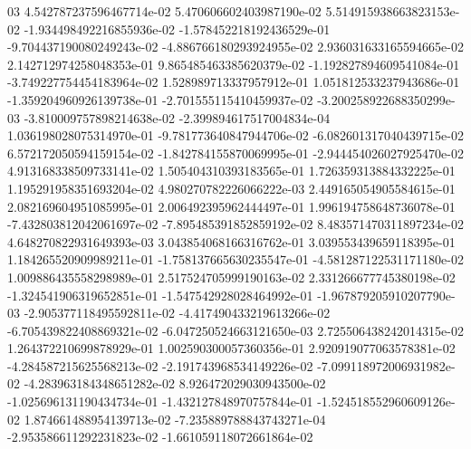 03	4.542787237596467714e-02	5.470606602403987190e-02	5.514915938663823153e-02	-1.934498492216855936e-02	-1.578452218192436529e-01	-9.704437190080249243e-02	-4.886766180293924955e-02	2.936031633165594665e-02	2.142712974258048353e-01	9.865485463385620379e-02	-1.192827894609541084e-01	-3.749227754454183964e-02	1.528989713337957912e-01	1.051812533237943686e-01	-1.359204960926139738e-01	-2.701555115410459937e-02	-3.200258922688350299e-03	-3.810009757898214638e-02	-2.399894617517004834e-04	1.036198028075314970e-01	-9.781773640847944706e-02	-6.082601317040439715e-02	6.572172050594159154e-02	-1.842784155870069995e-01	-2.944454026027925470e-02	4.913168338509733141e-02	1.505404310393183565e-01	1.726359313884332225e-01	1.195291958351693204e-02	4.980270782226066222e-03	2.449165054905584615e-01	2.082169604951085995e-01	2.006492395962444497e-01	1.996194758648736078e-01	-7.432803812042061697e-02	-7.895485391852859192e-02	8.483571470311897234e-02	4.648270822931649393e-03	3.043854068166316762e-01	3.039553439659118395e-01	1.184265520909989211e-01	-1.758137665630235547e-01	-4.581287122531171180e-02	1.009886435558298989e-01	2.517524705999190163e-02	2.331266677745380198e-02	-1.324541906319652851e-01	-1.547542928028464992e-01	-1.967879205910207790e-03	-2.905377118495592811e-02	-4.417490433219613266e-02	-6.705439822408869321e-02	-6.047250524663121650e-03	2.725506438242014315e-02	1.264372210699878929e-01	1.002590300057360356e-01	2.920919077063578381e-02	-4.284587215625568213e-02	-2.191743968534149226e-02	-7.099118972006931982e-02	-4.283963184348651282e-02	8.926472029030943500e-02	-1.025696131190434734e-01	-1.432127848970757844e-01	-1.524518552960609126e-02	1.874661488954139713e-02	-7.235889788843743271e-04	-2.953586611292231823e-02	-1.661059118072661864e-02
